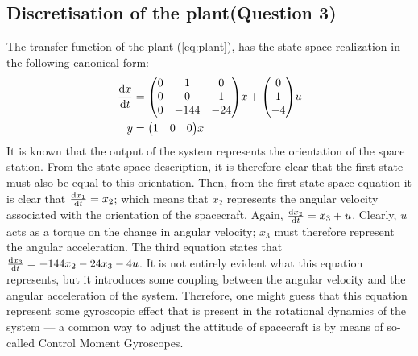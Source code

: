 \subsection{Discretisation of the plant\textnormal{\phantom{xxx}(Question 3)}}
The transfer function of the plant (\cref{eq:plant}), has the state-space realization in the following canonical form:
\begin{equation}
    \begin{aligned}
        \dv{x}{t} &= \mqty(0 & 1 & 0 \\ 0 & 0 & 1 \\ 0 & -144 & -24)x + \mqty(0 \\ 1 \\ -4)u\\
        y &= \mqty(1 & 0 & 0)x
    \end{aligned}
\end{equation}
It is known that the output of the system represents the orientation of the space station. From the state space description, it is therefore clear that the first state must also be equal to this orientation. Then, from the first state-space equation it is clear that $\dv{x_1}{t} = x_2$; which means that $x_2$ represents the angular velocity associated with the orientation of the spacecraft. Again, $\dv{x_2}{t} = x_3 + u$. Clearly, $u$ acts as a torque on the change in angular velocity; $x_3$ must therefore represent the angular acceleration. The third equation states that $\dv{x_3}{t} = -144x_2 - 24x_3 -4u$. It is not entirely evident what this equation represents, but it introduces some coupling between the angular velocity and the angular acceleration of the system. Therefore, one might guess that this equation represent some gyroscopic effect that is present in the rotational dynamics of the system --- a common way to adjust the attitude of spacecraft is by means of so-called Control Moment Gyroscopes.

